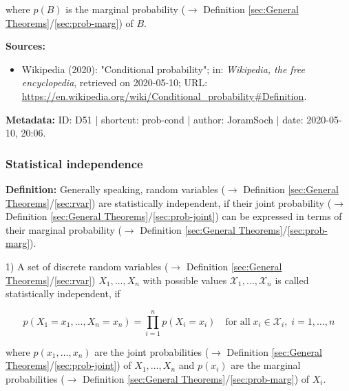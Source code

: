 \documentclass[a4paper,12pt,twoside]{book}
\begin{document}
where $p(B)$ is the marginal probability ($\rightarrow$ Definition \ref{sec:General Theorems}/\ref{sec:prob-marg}) of $B$.


\vspace{1em}
\textbf{Sources:}
\begin{itemize}
\item Wikipedia (2020): "Conditional probability"; in: \textit{Wikipedia, the free encyclopedia}, retrieved on 2020-05-10; URL: \url{https://en.wikipedia.org/wiki/Conditional_probability#Definition}.
\end{itemize}


\vspace{1em}
\textbf{Metadata:} ID: D51 | shortcut: prob-cond | author: JoramSoch | date: 2020-05-10, 20:06.
\vspace{1em}



\subsubsection[\textit{Statistical independence}]{Statistical independence} \label{sec:ind}
\setcounter{equation}{0}

\textbf{Definition:} Generally speaking, random variables ($\rightarrow$ Definition \ref{sec:General Theorems}/\ref{sec:rvar}) are statistically independent, if their joint probability ($\rightarrow$ Definition \ref{sec:General Theorems}/\ref{sec:prob-joint}) can be expressed in terms of their marginal probability ($\rightarrow$ Definition \ref{sec:General Theorems}/\ref{sec:prob-marg}).

\vspace{1em}
1) A set of discrete random variables ($\rightarrow$ Definition \ref{sec:General Theorems}/\ref{sec:rvar}) $X_1, \ldots, X_n$ with possible values $\mathcal{X}_1, \ldots, \mathcal{X}_n$ is called statistically independent, if

\begin{equation} \label{eq:ind-disc-ind}
p(X_1 = x_1, \ldots, X_n = x_n) = \prod_{i=1}^{n} p(X_i = x_i) \quad \text{for all} \; x_i \in \mathcal{X}_i, \; i = 1, \ldots, n
\end{equation}

where $p(x_1, \ldots, x_n)$ are the joint probabilities ($\rightarrow$ Definition \ref{sec:General Theorems}/\ref{sec:prob-joint}) of $X_1, \ldots, X_n$ and $p(x_i)$ are the marginal probabilities ($\rightarrow$ Definition \ref{sec:General Theorems}/\ref{sec:prob-marg}) of $X_i$.
\end{document}
